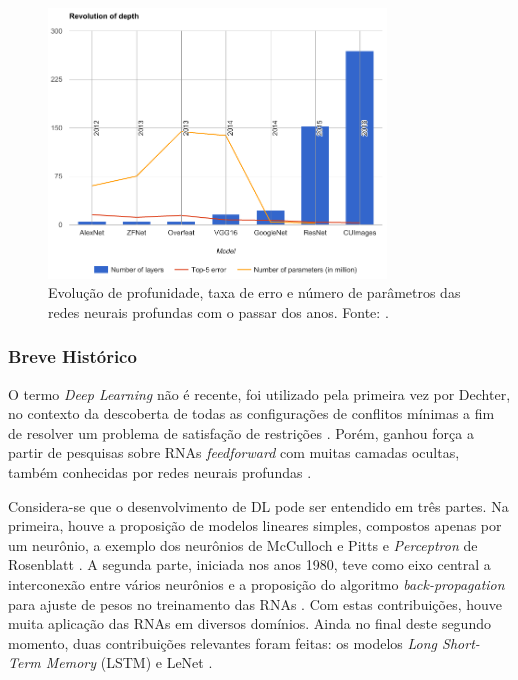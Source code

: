 \begin{figure}[h!]
	\centering
	\caption{Evolução de profunidade, taxa de erro e número de parâmetros das redes neurais profundas com o passar dos anos. Fonte: \cite{mediumcnn}.}
	\label{fig:compara_redes}
	\includegraphics[width=0.8\textwidth]{img/compara_redes.png}
\end{figure}

\subsubsection{Breve Histórico}

O termo \emph{Deep Learning} não é recente, foi utilizado pela primeira vez por Dechter, no contexto da descoberta de todas as configurações de conflitos mínimas a fim de resolver um problema de satisfação de restrições
\cite{dechter1986learning}. Porém, ganhou força a partir de pesquisas sobre RNAs \emph{feedforward} com muitas camadas ocultas, também conhecidas por redes neurais profundas \cite{deng2014deep}.


Considera-se que o desenvolvimento de DL pode ser entendido em três partes. Na primeira, houve a proposição de modelos lineares simples, compostos apenas por um neurônio, a exemplo dos neurônios de McCulloch e Pitts \cite{mcculloch1943logical} e \emph{Perceptron} de Rosenblatt  \cite{rosenblatt1958perceptron}. A segunda parte, iniciada nos anos 1980, teve como eixo central a interconexão entre vários neurônios e a proposição do algoritmo \emph{back-propagation} para ajuste de pesos no treinamento das RNAs  \cite{rumelhart1986parallel,rumelhart1986backpropagation}. Com estas contribuições, houve muita aplicação das RNAs em diversos domínios. Ainda no final deste segundo momento, duas contribuições relevantes foram feitas: os modelos \emph{Long Short-Term Memory} (LSTM) e LeNet \cite{lenet}.   

